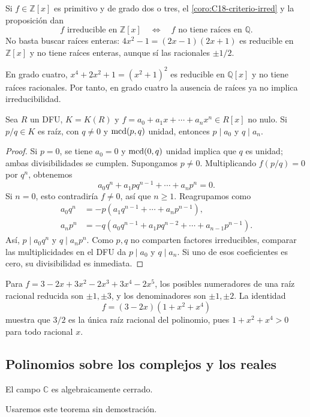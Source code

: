 \begin{ejem}
Si $f\in\mathbb Z[x]$ es primitivo y de grado dos o tres, el \cref{coro:C18-criterio-irred} y la proposición dan
\[
f\text{ irreducible en }\mathbb Z[x]
\quad\Longleftrightarrow\quad
f\text{ no tiene raíces en }\mathbb Q.
\]
No basta buscar raíces enteras: $4x^2-1=(2x-1)(2x+1)$ es reducible en $\mathbb Z[x]$ y no tiene raíces enteras, aunque sí las racionales $\pm1/2$.

En grado cuatro, $x^4+2x^2+1=(x^2+1)^2$ es reducible en $\mathbb Q[x]$ y no tiene raíces racionales. Por tanto, en grado cuatro la ausencia de raíces ya no implica irreducibilidad.
\end{ejem}

\begin{prop}\label{prop:C19-raices-racionales}
Sea $R$ un DFU, $K=K(R)$ y $f=a_0+a_1x+\cdots+a_nx^n\in R[x]$ no nulo. Si $p/q\in K$ es raíz, con $q\ne0$ y $\operatorname{mcd}(p,q)$ unidad, entonces $p\mid a_0$ y $q\mid a_n$.
\end{prop}
\begin{proof}
Si $p=0$, se tiene $a_0=0$ y $\operatorname{mcd}(0,q)$ unidad implica que $q$ es unidad; ambas divisibilidades se cumplen. Supongamos $p\ne0$. Multiplicando $f(p/q)=0$ por $q^n$, obtenemos
\[
a_0q^n+a_1pq^{n-1}+\cdots+a_np^n=0.
\]
Si $n=0$, esto contradiría $f\ne0$, así que $n\geq1$. Reagrupamos como
\[
\begin{aligned}
a_0q^n&=-p(a_1q^{n-1}+\cdots+a_np^{n-1}),\\
a_np^n&=-q(a_0q^{n-1}+a_1pq^{n-2}+\cdots+a_{n-1}p^{n-1}).
\end{aligned}
\]
Así, $p\mid a_0q^n$ y $q\mid a_np^n$. Como $p,q$ no comparten factores irreducibles, comparar las multiplicidades en el DFU da $p\mid a_0$ y $q\mid a_n$. Si uno de esos coeficientes es cero, su divisibilidad es inmediata.
\end{proof}

\begin{ejem}
Para $f=3-2x+3x^2-2x^3+3x^4-2x^5$, los posibles numeradores de una raíz racional reducida son $\pm1,\pm3$, y los denominadores son $\pm1,\pm2$. La identidad
\[
f=(3-2x)(1+x^2+x^4)
\]
muestra que $3/2$ es la única raíz racional del polinomio, pues $1+x^2+x^4>0$ para todo racional $x$.
\end{ejem}

\subsection{Polinomios sobre los complejos y los reales}\label{tema:19-2-3}
\begin{teo}\label{teo:C19-TFA}
El campo $\mathbb C$ es algebraicamente cerrado.
\end{teo}
Usaremos este teorema sin demostración.

